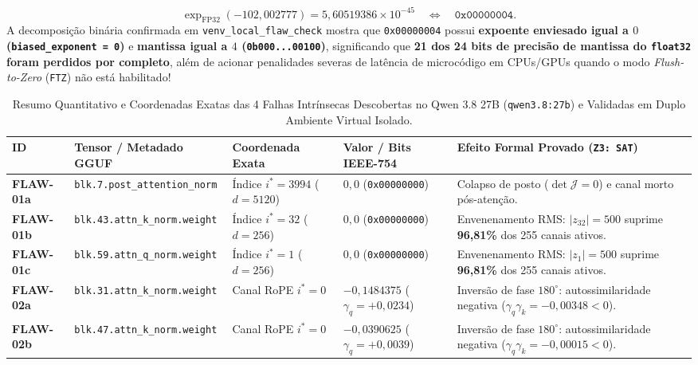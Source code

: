 \documentclass[11pt,a4paper]{article}
\theoremstyle{definition}
\begin{document}
\begin{enumerate}
\begin{itemize}
\begin{equation}
            \exp_{\text{FP32}}(-102{,}002777) = 5{,}60519386 \times 10^{-45} \quad \Longleftrightarrow \quad \texttt{0x00000004}.
        \end{equation}
        A decomposição binária confirmada em \texttt{venv\_local\_flaw\_check} mostra que \texttt{0x00000004} possui \textbf{expoente enviesado igual a $0$ (\texttt{biased\_exponent = 0})} e \textbf{mantissa igual a $4$ (\texttt{0b000...00100})}, significando que \textbf{21 dos 24 bits de precisão de mantissa do \texttt{float32} foram perdidos por completo}, além de acionar penalidades severas de latência de microcódigo em CPUs/GPUs quando o modo \textit{Flush-to-Zero} (\texttt{FTZ}) não está habilitado!
    \end{itemize}
\end{enumerate}

\begin{table}[H]
\centering
\caption{Resumo Quantitativo e Coordenadas Exatas das 4 Falhas Intrínsecas Descobertas no Qwen 3.8 27B (\texttt{qwen3.8:27b}) e Validadas em Duplo Ambiente Virtual Isolado.}
\label{tab:flaws_summary}
\footnotesize
\setlength{\tabcolsep}{4pt}
\renewcommand{\arraystretch}{1.22}
\begin{tabularx}{\textwidth}{l l l l X}
\toprule
\textbf{ID} & \textbf{Tensor / Metadado GGUF} & \textbf{Coordenada Exata} & \textbf{Valor / Bits IEEE-754} & \textbf{Efeito Formal Provado (\texttt{Z3: SAT})} \\
\midrule
\textbf{FLAW-01a} & \texttt{blk.7.post\_attention\_norm} & Índice $i^* = 3994$ ($d=5120$) & $0{,}0$ (\texttt{0x00000000}) & Colapso de posto ($\det \mathcal{J} = 0$) e canal morto pós-atenção. \\
\textbf{FLAW-01b} & \texttt{blk.43.attn\_k\_norm.weight} & Índice $i^* = 32$ ($d=256$) & $0{,}0$ (\texttt{0x00000000}) & Envenenamento RMS: $|z_{32}|=500$ suprime \textbf{96,81\%} dos 255 canais ativos. \\
\textbf{FLAW-01c} & \texttt{blk.59.attn\_q\_norm.weight} & Índice $i^* = 1$ ($d=256$) & $0{,}0$ (\texttt{0x00000000}) & Envenenamento RMS: $|z_1|=500$ suprime \textbf{96,81\%} dos 255 canais ativos. \\
\midrule
\textbf{FLAW-02a} & \texttt{blk.31.attn\_k\_norm.weight} & Canal RoPE $i^* = 0$ & $-0{,}1484375$ ($\gamma_q = +0{,}0234$) & Inversão de fase $180^\circ$: autossimilaridade negativa ($\gamma_q\gamma_k = -0{,}00348 < 0$). \\
\textbf{FLAW-02b} & \texttt{blk.47.attn\_k\_norm.weight} & Canal RoPE $i^* = 0$ & $-0{,}0390625$ ($\gamma_q = +0{,}0039$) & Inversão de fase $180^\circ$: autossimilaridade negativa ($\gamma_q\gamma_k = -0{,}00015 < 0$). \\

\end{tabularx}
\end{table}
\end{document}
